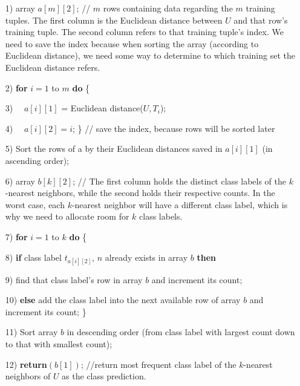 \begin{itemize}
	
	\item[1)] array $a[m][2]$; // $m$ rows containing data regarding the $m$ training tuples. The first column is the
	Euclidean distance between $U$ and that row’s training tuple. The second column refers to that
	training tuple’s index. We need to save the index because when sorting the array (according to
	Euclidean distance), we need some way to determine to which training set the Euclidean distance refers.

	\item[2)] \textbf{for} $i = 1$ to $m$ \textbf{do} \{

	\item[3)] $\quad a[i][1]$ = Euclidean distance($U, T_{i}$);
	
	\item[4)] $\quad a[i][2] = i$; \} // save the index, because rows will be sorted later
	
	\item[5)] Sort the rows of a by their Euclidean distances saved in $a[i][1]$ (in ascending order);
	
	\item[6)]  array $b[k][2]$; // The first column holds the distinct class labels of the $k$-nearest neighbors, while the
	second holds their respective counts. In the worst case, each $k$-nearest neighbor will have a different
	class label, which is why we need to allocate room for $k$ class labels.

	\item[7)] \textbf{for} $i = 1$ to $k$ \textbf{do} \{
	
	\item[8)] \quad \textbf{if} class label $t_{a[i][2]}$, $n$ already exists in array $b$ \textbf{then}
	
	\item[9)] \qquad find that class label’s row in array $b$ and increment its count;
	
	\item[10)] \quad \textbf{else} add the class label into the next available row of array $b$ and increment its count; \}
	
	\item[11)]  Sort array $b$ in descending order (from class label with largest count down to that with smallest count);
	
	\item[12)] \textbf{return}$(b[1])$; //return most frequent class label of the $k$-nearest neighbors of $U$ as the class prediction.

\end{itemize}


